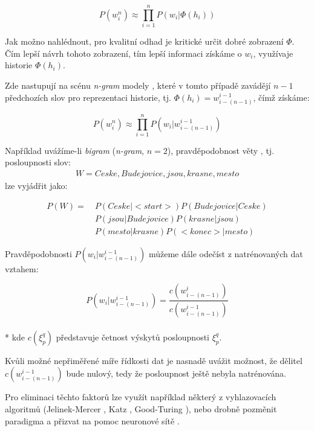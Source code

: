 \begin{equation}
	\label{eq:lm_ec}
	P(w^n_i) \approx \prod\limits_{i=1}^n P(w_i|\Phi (h_i))
\end{equation}

Jak možno nahlédnout, pro kvalitní odhad je kritické určit dobré zobrazení $\Phi$. Čím lepší návrh tohoto zobrazení, tím lepší informaci získáme o $w_i$, využívaje historie $\Phi (h_i)$.

Zde nastupují na scénu {\sl n-gram} modely \cite{byeo_2012}\cite{masa_1997}, které v tomto případě zavádějí $n-1$ předchozích slov pro reprezentaci historie, tj. $\Phi (h_i) = w_{i-(n-1)}^{i-1}$, čímž získáme:

\begin{equation}
	\label{eq:lm_ec}
	P(w^n_i) \approx \prod\limits_{i=1}^n P(w_i|w_{i-(n-1)}^{i-1})
\end{equation}

Například uvážíme-li {\sl bigram} ({\sl n-gram}, $n = 2$), pravděpodobnost věty , tj. posloupnosti slov:
%
\begin{align*}
	W = Ceske, Budejovice, jsou, krasne, mesto
\end{align*}
%
lze vyjádřit jako:

\begin{align*}
	P(W) =&~P(Ceske|<\! start\!>)P(Budejovice|Ceske)\\
	      &~P(jsou|Budejovice)P(krasne|jsou)\\
	      &~P(mesto|krasne)P(<\! konec\!>|mesto)
\end{align*}

Pravděpodobnosti $P(w_i|w_{i-(n-1)}^{i-1})$ můžeme dále odečíst z natrénovaných dat vztahem:

\begin{equation}
	\label{eq:lm_est}
	P(w_i|w_{i-(n-1)}^{i-1}) = \frac{c(w_{i-(n-1)}^{i})}{c(w_{i-(n-1)}^{i-1})}
\end{equation}
\\*
kde $c(\xi_p^q)$ představuje četnost výskytů posloupnosti $\xi_p^q$.

Kvůli možné nepřiměřené míře řídkosti dat je nasnadě uvážit možnost, že dělitel $c(w_{i-(n-1)}^{i-1})$ bude nulový, tedy že posloupnost ještě nebyla natrénována. 

Pro eliminaci těchto faktorů lze využít například některý z vyhlazovacích algoritmů (Jelinek-Mercer \cite{jelinek_1980}, Katz \cite{katz_1987}, Good-Turing \cite{church_1991}), nebo drobně pozměnit paradigma a přizvat na pomoc neuronové sítě \cite{chienli_2013}.

